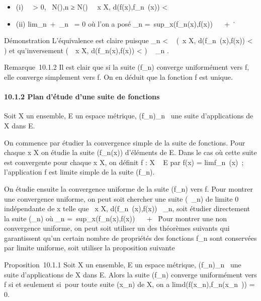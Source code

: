 \documentclass[]{article}
\begin{document}
\begin{itemize}
\itemsep1pt\parskip0pt
\item
  (i) \forall~~\epsilon \textgreater{} 0,
  \exists~N(\epsilon),\quad n ≥ N(\epsilon)
  \rigtharrow~\forall~x \in X, d(f(x),f\_n~(x)) \textless{}
  \epsilon
\item
  (ii) lim\_n\rightarrow~+\infty~\mu\_n~ = 0 où
  l'on a posé \mu\_n =\
  sup\_x\inXd(f\_n(x),f(x)) \in {}~ \cup\ +
  \infty~\.
\end{itemize}

Démonstration L'équivalence est claire puisque \mu\_n \textless{}
\epsilon \rigtharrow~ (\forall~x \in X, d(f\_n~(x),f(x))
\textless{} \epsilon) et qu'inversement (\forall~~x \in X,
d(f\_n(x),f(x)) \textless{} \epsilon) \rigtharrow~ \mu\_n \leq \epsilon.

Remarque~10.1.2 Il est clair que si la suite (f\_n) converge
uniformément vers f, elle converge simplement vers f. On en déduit que
la fonction f est unique.

\paragraph{10.1.2 Plan d'étude d'une suite de fonctions}

Soit X un ensemble, E un espace métrique, (f\_n)\_n\in{}~
une suite d'applications de X dans E.

On commence par étudier la convergence simple de la suite de fonctions.
Pour chaque x \in X on étudie la suite (f\_n(x)) d'éléments de E.
Dans le cas où cette suite est convergente pour chaque x \in X, on définit
f : X \rightarrow~ E par f(x) = limf\_n~(x)~;
l'application f est limite simple de la suite (f\_n).

On étudie ensuite la convergence uniforme de la suite (f\_n)
vers f. Pour montrer une convergence uniforme, on peut soit chercher une
suite (\alpha~\_n) de limite 0 indépendante de x telle que
\forall~x \in X, d(f\_n~(x),f(x)) \leq
\alpha~\_n, soit étudier directement la suite (\mu\_n) où
\mu\_n =\
sup\_x\inXd(f\_n(x),f(x)) \in {}~ \cup\ +
\infty~\. Pour montrer une non convergence uniforme, on peut
soit utiliser un des théorèmes suivants qui garantissent qu'un certain
nombre de propriétés des fonctions f\_n sont conservées par
limite uniforme, soit utiliser la proposition suivante

Proposition~10.1.1 Soit X un ensemble, E un espace métrique,
(f\_n)\_n\in{}~ une suite d'applications de X dans E. Alors
la suite (f\_n) converge uniformément vers f si et seulement
si~pour toute suite (x\_n) de X, on a
limd(f(x\_n),f\_n(x\_n~))
= 0.
\end{document}
